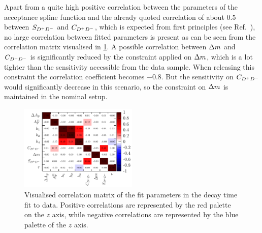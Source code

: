 Apart from a quite high positive correlation between the parameters of the
acceptance spline function and the already quoted correlation of about
\num{0.5} between $S_{{{D}^+}{{D}^-}}$ and $C_{{{D}^+}{{D}^-}}$, which is expected from first principles
(see Ref.~\cite{LHCb-ANA-2011-004}), no large correlation between fitted parameters
is present as can be seen from the correlation matrix visualised in
\cref{fig:b02dd:decaytimefit:FullFitCorrMatrixHotCold}. A possible correlation
between ${\Delta m}$ and $C_{{{D}^+}{{D}^-}}$ is significantly reduced by the constraint applied on ${\Delta m}$,
which is a lot tighter than the sensitivity accessible from the data sample.
When releasing this constraint the correlation coefficient becomes \num{-0.8}.
But the sensitivity on $C_{{{D}^+}{{D}^-}}$ would significantly decrease in this scenario, so
the constraint on ${\Delta m}$ is maintained in the nominal setup.

\begin{figure}[htb]
\centering
\includegraphics[width=0.5\textwidth]{07-B02DD/tikz/pdf/FitResultsCorrMatrix_RedBlueDiscrete_wText.pdf}
\caption{Visualised correlation matrix of the fit parameters in the decay time
fit to data. Positive correlations are represented by the red palette on the $z$ axis,
while negative correlations are represented by the blue palette of the $z$
axis.}
\label{fig:b02dd:decaytimefit:FullFitCorrMatrixHotCold}
\end{figure}

